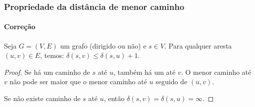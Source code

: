 \documentclass{beamer}
\begin{document}
\begin{frame}
\frametitle{Propriedade da distância de menor caminho}
\framesubtitle{Correção}

\begin{lemma}
\label{lemma:dist-menor-caminho}
Seja $G = (V, E)$ um grafo (dirigido ou não) e $s \in V$. 
Para qualquer aresta $(u, v) \in E$, temos: \alert{$\delta(s, v) \le \delta(s, u)+1$}.
\end{lemma}
\pause
\begin{center}
\end{center}
\begin{proof}
  Se há um caminho de $s$ até $u$, também há um até $v$. 
  O menor caminho até $v$ não pode ser maior que o menor caminho até $u$ seguido de $(u, v)$.
  
  Se não existe caminho de $s$ até $u$, então $\delta(s, v) = \delta(s, u) = \infty$.
\end{proof}

\end{frame}
\end{document}
